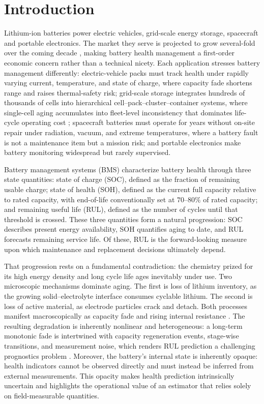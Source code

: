 ﻿\section{Introduction}
\label{sec:intro}

Lithium-ion batteries power electric vehicles, grid-scale energy storage,
 spacecraft and portable electronics. The market they serve is projected 
 to grow several-fold over the coming decade
\cite{ref_yang_review}, making battery health
management a first-order economic concern rather than a technical
nicety. Each application stresses battery management differently:
electric-vehicle packs must track health under rapidly varying
current, temperature, and state of charge, where capacity fade
shortens range and raises thermal-safety risk; grid-scale storage
integrates hundreds of thousands of cells into hierarchical
cell--pack--cluster--container systems, where single-cell aging
accumulates into fleet-level inconsistency that dominates life-cycle
operating cost \cite{ref_qu_bess}; spacecraft batteries must operate
for years without on-site repair under radiation, vacuum, and
extreme temperatures, where a battery fault is not a maintenance
item but a mission risk; and portable electronics
make battery monitoring widespread but rarely supervised.

Battery management systems (BMS) characterize battery health through three state quantities: 
state of charge (SOC), defined as the fraction of remaining usable charge; 
state of health (SOH), defined as the current full capacity relative to rated capacity, 
with end-of-life conventionally set at $70$--$80\%$ of rated capacity; and remaining useful life (RUL),
defined as the number of cycles until that threshold is crossed. 
These three quantities form a natural progression: SOC describes present energy availability, 
SOH quantifies aging to date, and RUL forecasts remaining service life. 
Of these, RUL is the forward-looking measure upon which maintenance and 
replacement decisions ultimately depend.

That progression rests on a fundamental contradiction: the chemistry
prized for its high energy density and long cycle life ages
inevitably under use. Two microscopic mechanisms dominate aging. 
The first is loss of lithium inventory, as the growing solid–electrolyte interface consumes cyclable lithium. 
The second is loss of active material, as electrode particles crack and detach. 
Both processes manifest macroscopically as capacity fade and rising internal resistance
\cite{ref_yang_review}. The resulting degradation is inherently nonlinear and heterogeneous: 
a long-term monotonic fade is intertwined with capacity regeneration events, stage-wise transitions, 
and measurement noise, which renders RUL prediction a challenging prognostics problem \cite{ref_rulmamba,ref_omnitie}.
Moreover, the battery’s internal state is inherently opaque: 
health indicators cannot be observed directly and must instead be inferred from external measurements. 
This opacity makes health prediction intrinsically uncertain and highlights the operational value 
of an estimator that relies solely on field-measurable quantities.

